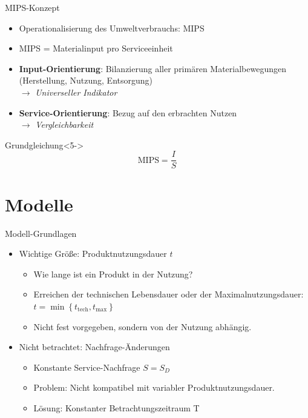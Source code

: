 \documentclass[beamer, xcolor={table,usenames,dvipsnames}]{beamer}
\begin{document}
	\begin{frame}{MIPS-Konzept}
		\begin{itemize}
			\item<1-> Operationalisierung des Umweltverbrauchs: MIPS %
			\item<2-> MIPS = Materialinput pro Serviceeinheit
			\item<3-> \textbf{Input-Orientierung}: Bilanzierung aller primären Materialbewegungen (Herstellung, Nutzung, Entsorgung) \\
			$\rightarrow$ \emph{Universeller Indikator}
			\item<4-> \textbf{Service-Orientierung}: Bezug auf den erbrachten Nutzen \\
			$\rightarrow$ \emph{Vergleichbarkeit}
		\end{itemize}
		\begin{block}{Grundgleichung}<5->
			$$\text{MIPS} = \frac{I}{S}$$
		\end{block}
	\end{frame}

\section{Modelle}
	\begin{frame}{Modell-Grundlagen}
		\begin{itemize}
			\pause
			\item Wichtige Größe: Produktnutzungsdauer $t$
			\begin{itemize}
				\item Wie lange ist ein Produkt in der Nutzung?
				\item Erreichen der technischen Lebensdauer oder der Maximalnutzungsdauer:
				$t = \min \left\{t_\text{tech}, t_{\text{max}} \right\}$
				\item Nicht fest vorgegeben, sondern von der Nutzung abhängig.
			\end{itemize}
			\pause
			\item Nicht betrachtet: Nachfrage-Änderungen
			\begin{itemize}
				\item Konstante Service-Nachfrage $S = S_D$
				\item Problem: Nicht kompatibel mit variabler Produktnutzungsdauer.
				\item Lösung: Konstanter Betrachtungszeitraum T
			\end{itemize}
		\end{itemize}
	\end{frame}
\end{document}
